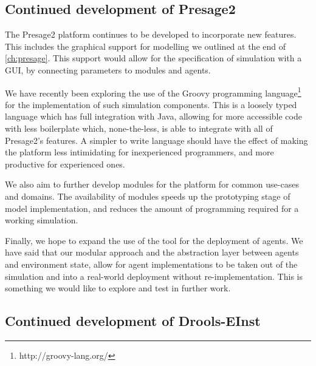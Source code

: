 
\subsection{Continued development of Presage2}

The Presage2 platform continues to be developed to incorporate new features.
This includes the graphical support for modelling we outlined at the end of
\autoref{ch:presage}. This support would allow for the specification of
simulation with a \ac{GUI}, by connecting parameters to modules and agents.

We have recently been exploring the use of the Groovy programming language\footnote{http://groovy-lang.org/} for
the implementation of such simulation components. This is a loosely typed language
which has full integration with Java, allowing for more accessible code with
less boilerplate which, none-the-less, is able to integrate with all of
Presage2's features. A simpler to write language should have the effect of
making the platform less intimidating for inexperienced programmers, and more
productive for experienced ones.

We also aim to further develop modules for the platform for common use-cases
and domains. The availability of modules speeds up the prototyping stage of
model implementation, and reduces the amount of programming required for a
working simulation.

Finally, we hope to expand the use of the tool for the deployment of agents.
We have said that our modular approach and the abstraction layer between
agents and environment state, allow for agent implementations to be taken out
of the simulation and into a real-world deployment without re-implementation.
This is something we would like to explore and test in further work.

\subsection{Continued development of Drools-EInst}

